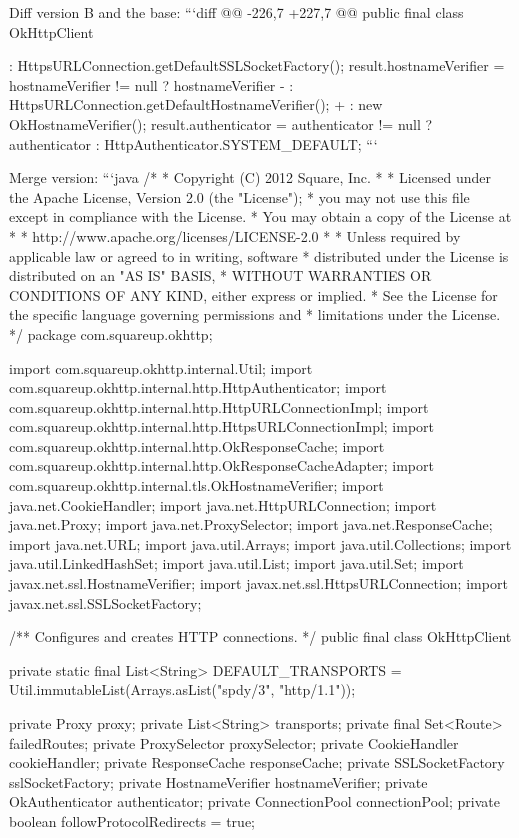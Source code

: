 \begin{prompt}
{{{{{{Diff version B and the base:
```diff
@@ -226,7 +227,7 @@ public final class OkHttpClient {
         : HttpsURLConnection.getDefaultSSLSocketFactory();
     result.hostnameVerifier = hostnameVerifier != null
         ? hostnameVerifier
-        : HttpsURLConnection.getDefaultHostnameVerifier();
+        : new OkHostnameVerifier();
     result.authenticator = authenticator != null
         ? authenticator
         : HttpAuthenticator.SYSTEM_DEFAULT;
```

Merge version:
```java
/*
 * Copyright (C) 2012 Square, Inc.
 *
 * Licensed under the Apache License, Version 2.0 (the "License");
 * you may not use this file except in compliance with the License.
 * You may obtain a copy of the License at
 *
 *      http://www.apache.org/licenses/LICENSE-2.0
 *
 * Unless required by applicable law or agreed to in writing, software
 * distributed under the License is distributed on an "AS IS" BASIS,
 * WITHOUT WARRANTIES OR CONDITIONS OF ANY KIND, either express or implied.
 * See the License for the specific language governing permissions and
 * limitations under the License.
 */
package com.squareup.okhttp;

import com.squareup.okhttp.internal.Util;
import com.squareup.okhttp.internal.http.HttpAuthenticator;
import com.squareup.okhttp.internal.http.HttpURLConnectionImpl;
import com.squareup.okhttp.internal.http.HttpsURLConnectionImpl;
import com.squareup.okhttp.internal.http.OkResponseCache;
import com.squareup.okhttp.internal.http.OkResponseCacheAdapter;
import com.squareup.okhttp.internal.tls.OkHostnameVerifier;
import java.net.CookieHandler;
import java.net.HttpURLConnection;
import java.net.Proxy;
import java.net.ProxySelector;
import java.net.ResponseCache;
import java.net.URL;
import java.util.Arrays;
import java.util.Collections;
import java.util.LinkedHashSet;
import java.util.List;
import java.util.Set;
import javax.net.ssl.HostnameVerifier;
import javax.net.ssl.HttpsURLConnection;
import javax.net.ssl.SSLSocketFactory;

/** Configures and creates HTTP connections. */
public final class OkHttpClient {
  private static final List<String> DEFAULT_TRANSPORTS
      = Util.immutableList(Arrays.asList("spdy/3", "http/1.1"));

  private Proxy proxy;
  private List<String> transports;
  private final Set<Route> failedRoutes;
  private ProxySelector proxySelector;
  private CookieHandler cookieHandler;
  private ResponseCache responseCache;
  private SSLSocketFactory sslSocketFactory;
  private HostnameVerifier hostnameVerifier;
  private OkAuthenticator authenticator;
  private ConnectionPool connectionPool;
  private boolean followProtocolRedirects = true;

}}}}}}}}
\end{prompt}

